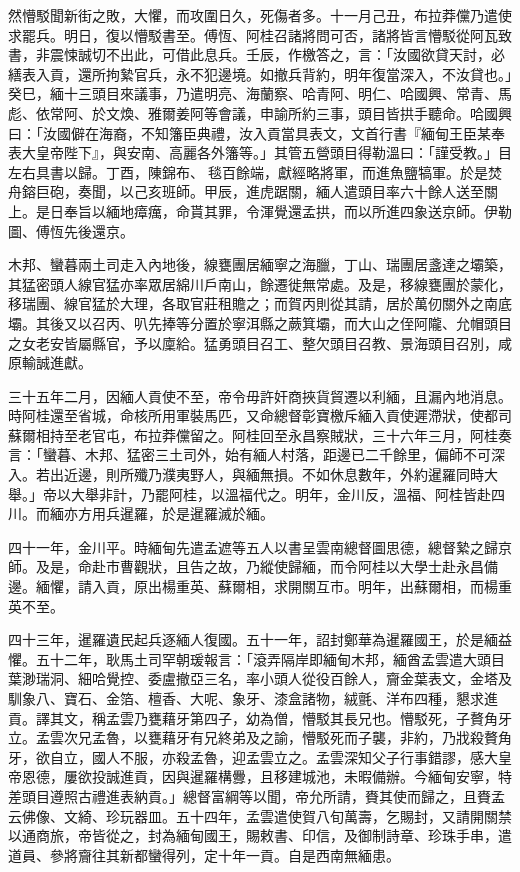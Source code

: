 \begin{pinyinscope}
然懵駁聞新街之敗，大懼，而攻圍日久，死傷者多。十一月己丑，布拉莽儻乃遣使求罷兵。明日，復以懵駁書至。傅恆、阿桂召諸將問可否，諸將皆言懵駁從阿瓦致書，非震悚誠切不出此，可借此息兵。壬辰，作檄答之，言：「汝國欲貸天討，必繕表入貢，還所拘縶官兵，永不犯邊境。如撤兵背約，明年復當深入，不汝貸也。」癸巳，緬十三頭目來議事，乃遣明亮、海蘭察、哈青阿、明仁、哈國興、常青、馬彪、依常阿、於文煥、雅爾姜阿等會議，申諭所約三事，頭目皆拱手聽命。哈國興曰：「汝國僻在海裔，不知籓臣典禮，汝入貢當具表文，文首行書『緬甸王臣某奉表大皇帝陛下』，與安南、高麗各外籓等。」其管五營頭目得勒溫曰：「謹受教。」目左右具書以歸。丁酉，陳錦布、毯百餘端，獻經略將軍，而進魚鹽犒軍。於是焚舟鎔巨砲，奏聞，以己亥班師。甲辰，進虎踞關，緬人遣頭目率六十餘人送至關上。是日奉旨以緬地瘴癘，命貰其罪，令渾覺還孟拱，而以所進四象送京師。伊勒圖、傅恆先後還京。

木邦、蠻暮兩土司走入內地後，線甕團居緬寧之海臘，丁山、瑞團居盞達之壩築，其猛密頭人線官猛亦率眾居綿川戶南山，餘遷徙無常處。及是，移線甕團於蒙化，移瑞團、線官猛於大理，各取官莊租贍之；而賀丙則從其請，居於萬仞關外之南底壩。其後又以召丙、叭先捧等分置於寧洱縣之蕨箕壩，而大山之侄阿隴、允帽頭目之女老安皆屬縣官，予以廩給。猛勇頭目召工、整欠頭目召教、景海頭目召別，咸原輸誠進獻。

三十五年二月，因緬人貢使不至，帝令毋許奸商挾貨貿遷以利緬，且漏內地消息。時阿桂還至省城，命核所用軍裝馬匹，又命總督彰寶檄斥緬入貢使遲滯狀，使都司蘇爾相持至老官屯，布拉莽儻留之。阿桂回至永昌察賊狀，三十六年三月，阿桂奏言：「蠻暮、木邦、猛密三土司外，始有緬人村落，距邊已二千餘里，偏師不可深入。若出近邊，則所殲乃濮夷野人，與緬無損。不如休息數年，外約暹羅同時大舉。」帝以大舉非計，乃罷阿桂，以溫福代之。明年，金川反，溫福、阿桂皆赴四川。而緬亦方用兵暹羅，於是暹羅滅於緬。

四十一年，金川平。時緬甸先遣孟遮等五人以書呈雲南總督圖思德，總督縶之歸京師。及是，命赴市曹觀狀，且告之故，乃縱使歸緬，而令阿桂以大學士赴永昌備邊。緬懼，請入貢，原出楊重英、蘇爾相，求開關互市。明年，出蘇爾相，而楊重英不至。

四十三年，暹羅遺民起兵逐緬人復國。五十一年，詔封鄭華為暹羅國王，於是緬益懼。五十二年，耿馬土司罕朝瑗報言：「滾弄隔岸即緬甸木邦，緬酋孟雲遣大頭目葉渺瑞洞、細哈覺控、委盧撤亞三名，率小頭人從役百餘人，齎金葉表文，金塔及馴象八、寶石、金箔、檀香、大呢、象牙、漆盒諸物，絨氈、洋布四種，懇求進貢。譯其文，稱孟雲乃甕藉牙第四子，幼為僧，懵駁其長兄也。懵駁死，子贅角牙立。孟雲次兄孟魯，以甕藉牙有兄終弟及之諭，懵駁死而子襲，非約，乃戕殺贅角牙，欲自立，國人不服，亦殺孟魯，迎孟雲立之。孟雲深知父子行事錯謬，感大皇帝恩德，屢欲投誠進貢，因與暹羅構釁，且移建城池，未暇備辦。今緬甸安寧，特差頭目遵照古禮進表納貢。」總督富綱等以聞，帝允所請，賚其使而歸之，且賚孟云佛像、文綺、珍玩器皿。五十四年，孟雲遣使賀八旬萬壽，乞賜封，又請開關禁以通商旅，帝皆從之，封為緬甸國王，賜敕書、印信，及御制詩章、珍珠手串，遣道員、參將齎往其新都蠻得列，定十年一貢。自是西南無緬患。


\end{pinyinscope}
